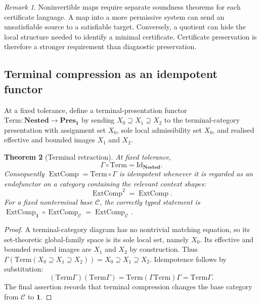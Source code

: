 \documentclass[11pt]{article}
\theoremstyle{plain}
\newtheorem{theorem}{Theorem}[section]
\theoremstyle{definition}
\theoremstyle{remark}
\newtheorem{remark}[theorem]{Remark}
\begin{document}
\begin{remark}
Noninvertible maps require separate soundness theorems for each certificate
language. A map into a more permissive system can send an unsatisfiable source to
a satisfiable target. Conversely, a quotient can hide the local structure needed
to identify a minimal certificate. Certificate preservation is therefore a
stronger requirement than diagnostic preservation.
\end{remark}

\subsection{Terminal compression as an idempotent functor}

At a fixed tolerance, define a terminal-presentation functor
$\mathrm{Term}:\mathbf{Nested}\to\mathbf{Pres}_{\mathbf 1}$ by sending
$X_0\supseteq X_1\supseteq X_2$ to the terminal-category presentation with
assignment set $X_0$, sole local admissibility set $X_0$, and realised effective
and bounded images $X_1$ and $X_2$.

\begin{theorem}[Terminal retraction]
\label{thm:terminal-retraction-monograph}
At fixed tolerance,
\[
\Gamma\circ\mathrm{Term}=\mathrm{Id}_{\mathbf{Nested}}.
\]
Consequently $\operatorname{ExtComp}=\mathrm{Term}\circ\Gamma$ is idempotent
whenever it is regarded as an endofunctor on a category containing the relevant
context shapes:
\[
\operatorname{ExtComp}^2=\operatorname{ExtComp}.
\]
For a fixed nonterminal base $\mathcal C$, the correctly typed statement is
$\operatorname{ExtComp}_{\mathbf 1}\circ\operatorname{ExtComp}_{\mathcal C}
=\operatorname{ExtComp}_{\mathcal C}$.
\end{theorem}

\begin{proof}
A terminal-category diagram has no nontrivial matching equation, so its
set-theoretic global-family space is its sole local set, namely $X_0$. Its
effective and bounded realised images are $X_1$ and $X_2$ by construction. Thus
$\Gamma(\mathrm{Term}(X_0\supseteq X_1\supseteq X_2))=X_0\supseteq X_1\supseteq
X_2$. Idempotence follows by substitution:
\[
(\mathrm{Term}\Gamma)(\mathrm{Term}\Gamma)
=\mathrm{Term}(\Gamma\mathrm{Term})\Gamma
=\mathrm{Term}\Gamma.
\]
The final assertion records that terminal compression changes the base category
from $\mathcal C$ to $\mathbf 1$.
\end{proof}
\end{document}
